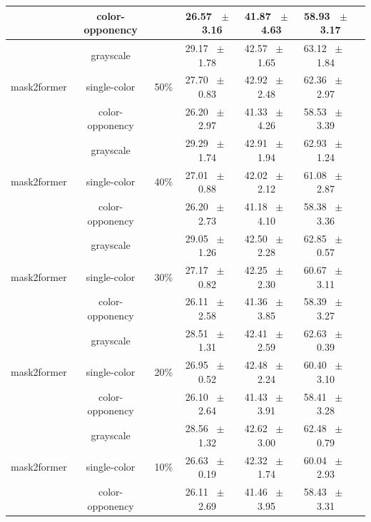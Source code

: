 \begin{table}[h]
\begin{tabular}{@{}lccc ccc@{}}
    & color-opponency &  & 26.57 ~$\pm$~ 3.16 & 41.87 ~$\pm$~ 4.63 & 58.93 ~$\pm$~ 3.17 \\
    \midrule
    \multirow{3}{*}{mask2former} & grayscale & \multirow{3}{*}{50\%} & 29.17 ~$\pm$~ 1.78 & 42.57 ~$\pm$~ 1.65 & 63.12 ~$\pm$~ 1.84 \\
    & single-color &  & 27.70 ~$\pm$~ 0.83 & 42.92 ~$\pm$~ 2.48 & 62.36 ~$\pm$~ 2.97 \\
    & color-opponency &  & 26.20 ~$\pm$~ 2.97 & 41.33 ~$\pm$~ 4.26 & 58.53 ~$\pm$~ 3.39 \\
    \midrule
    \multirow{3}{*}{mask2former} & grayscale & \multirow{3}{*}{40\%} & 29.29 ~$\pm$~ 1.74 & 42.91 ~$\pm$~ 1.94 & 62.93 ~$\pm$~ 1.24 \\
    & single-color &  & 27.01 ~$\pm$~ 0.88 & 42.02 ~$\pm$~ 2.12 & 61.08 ~$\pm$~ 2.87 \\
    & color-opponency &  & 26.20 ~$\pm$~ 2.73 & 41.18 ~$\pm$~ 4.10 & 58.38 ~$\pm$~ 3.36 \\
    \midrule
    \multirow{3}{*}{mask2former} & grayscale & \multirow{3}{*}{30\%} & 29.05 ~$\pm$~ 1.26 & 42.50 ~$\pm$~ 2.28 & 62.85 ~$\pm$~ 0.57 \\
    & single-color &  & 27.17 ~$\pm$~ 0.82 & 42.25 ~$\pm$~ 2.30 & 60.67 ~$\pm$~ 3.11 \\
    & color-opponency &  & 26.11 ~$\pm$~ 2.58 & 41.36 ~$\pm$~ 3.85 & 58.39 ~$\pm$~ 3.27 \\
    \midrule
    \multirow{3}{*}{mask2former} & grayscale & \multirow{3}{*}{20\%} & 28.51 ~$\pm$~ 1.31 & 42.41 ~$\pm$~ 2.59 & 62.63 ~$\pm$~ 0.39 \\
    & single-color &  & 26.95 ~$\pm$~ 0.52 & 42.48 ~$\pm$~ 2.24 & 60.40 ~$\pm$~ 3.10 \\
    & color-opponency &  & 26.10 ~$\pm$~ 2.64 & 41.43 ~$\pm$~ 3.91 & 58.41 ~$\pm$~ 3.28 \\
    \midrule
    \multirow{3}{*}{mask2former} & grayscale & \multirow{3}{*}{10\%} & 28.56 ~$\pm$~ 1.32 & 42.62 ~$\pm$~ 3.00 & 62.48 ~$\pm$~ 0.79 \\
    & single-color &  & 26.63 ~$\pm$~ 0.19 & 42.32 ~$\pm$~ 1.74 & 60.04 ~$\pm$~ 2.93 \\
    & color-opponency &  & 26.11 ~$\pm$~ 2.69 & 41.46 ~$\pm$~ 3.95 & 58.43 ~$\pm$~ 3.31 \\
    \midrule
    \bottomrule
  \end{tabular}
  \label{tab:sparse_results_mask2former_acdc_night}
\end{table}